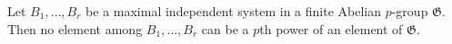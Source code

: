 Let $B_1, \ldots, B_r$ be a maximal independent system in a finite Abelian $p$-group $\mathfrak{G}$. Then no element among $B_1, \ldots, B_r$ can be a $p$th power of an element of $\mathfrak{G}$.
